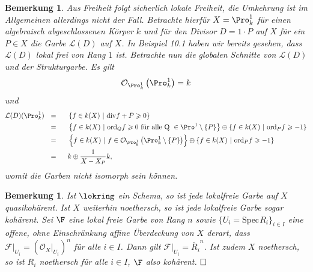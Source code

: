 \documentclass[11pt]{book}
\newtheorem{remark}[theorem]{Bemerkung}
\theoremstyle{nonumberbreak}
\newenvironment{defin}[1][]{\ifthenelse{\equal{#1}{}}{\definition}{\definition[#1]}\rm}{\enddefinition}
\newenvironment{pr}[1][]{\ifthenelse{\equal{#1}{}}{\proof}{\proof[#1]}\rm}{\endproof}
\newcommand{\spec}{\mathrm{Spec} \hspace{1pt} }
\begin{document}
\begin{spacing}{1.4}
\begin{defin}
\end{defin}


\begin{remark}   %
Aus Freiheit folgt sicherlich lokale Freiheit, die Umkehrung ist im Allgemeinen allerdings nicht der Fall. Betrachte hierfür $X= \Pro^1_k$ für einen algebraisch abgeschlossenen Körper $k$ und für den Divisor $D=1 \cdot P$ auf $X$ für ein $P \in X$ die Garbe $\mathcal{L}(D)$ auf $X$. In Beispiel 10.1 haben wir bereits gesehen, dass $\mathcal{L}(D)$ lokal frei von Rang $1$ ist. Betrachte nun die globalen Schnitte von $\mathcal{L}(D)$ und der Strukturgarbe. Es gilt 
$$\mathcal{O}_{\Pro^1_k} \left( \Pro^1_k\right) = k$$
und 
\setlength{\abovedisplayskip}{5.5pt}
\setlength{\belowdisplayskip}{5.5pt}
\begin{alignat*}{5}
\mathcal{L}(D)(\Pro^1_k) \ \ &=&& \ \ \left\{ f \in k(X) \ \vert \ \mathrm{div} f + P \geqslant 0 \right\} \\
&=&& \ \ \left\{ f \in k(X) \ \vert \ \mathrm{ord}_Qf \geqslant 0 \text{ für alle Q } \in \Pro^1 \setminus \{P\} \right\} \oplus \left\{ f \in k(X) \ \vert \ \mathrm{ord}_P f \geqslant -1 \right\}\\
&=&& \ \ \left\{ f \in k(X) \ \vert \ f \in \mathcal{O}_{\Pro^1_k}\left( \Pro^1_k \setminus \{P\} \right) \right\} \oplus \left\{ f \in k(X) \ \vert \ \mathrm{ord}_P f \geqslant -1 \right\}\\
&=&& \ \ k \oplus \frac{1}{X-X_P} k,
\end{alignat*}
womit die Garben nicht isomorph sein können.

\end{remark}


\begin{remark} %

Ist $\lokring$ ein Schema, so ist jede lokalfreie Garbe auf $X$ quasikohärent. Ist $X$ weiterhin noethersch, so ist jede lokalfreie Garbe sogar kohärent.
\begin{pr} Sei $\F$ eine lokal freie Garbe von Rang $n$ sowie $\{U_i=\spec R_i\}_{i \in I}$ eine offene, ohne Einschränkung affine Überdeckung von $X$ derart, dass $\mathcal{F} \vert_{U_i} = (\mathcal{O}_X \vert_{U_i})^n$ für alle $i \in I$. Dann gilt $\mathcal{F}\vert_{U_i} = \tilde{R_i}^n$. Ist zudem $X$ noethersch, so ist $R_i$ noethersch für alle $i \in I$, $\F$ also kohärent. $\hfill \Box$
\end{pr}
\end{remark}



\end{spacing}
\end{document}
